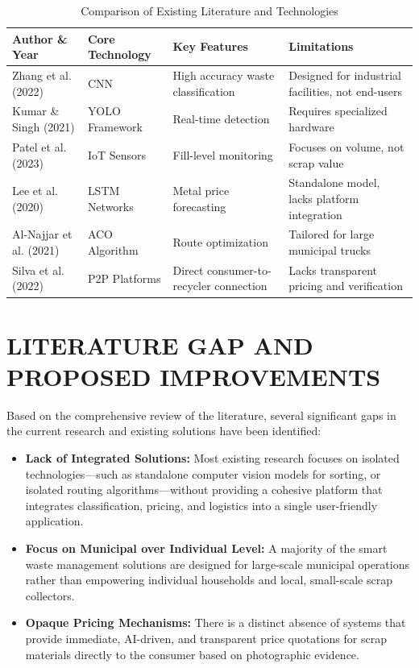 \begin{table}[H]
\centering
\caption{Comparison of Existing Literature and Technologies}
\renewcommand{\arraystretch}{1.5}
\begin{tabular}{|p{3cm}|p{3cm}|p{4cm}|p{4cm}|}
\hline
\textbf{Author \& Year} & \textbf{Core Technology} & \textbf{Key Features} & \textbf{Limitations} \\
\hline
Zhang et al. (2022) & CNN & High accuracy waste classification & Designed for industrial facilities, not end-users \\
\hline
Kumar \& Singh (2021) & YOLO Framework & Real-time detection & Requires specialized hardware \\
\hline
Patel et al. (2023) & IoT Sensors & Fill-level monitoring & Focuses on volume, not scrap value \\
\hline
Lee et al. (2020) & LSTM Networks & Metal price forecasting & Standalone model, lacks platform integration \\
\hline
Al-Najjar et al. (2021) & ACO Algorithm & Route optimization & Tailored for large municipal trucks \\
\hline
Silva et al. (2022) & P2P Platforms & Direct consumer-to-recycler connection & Lacks transparent pricing and verification \\
\hline
\end{tabular}
\end{table}

\section{LITERATURE GAP AND PROPOSED IMPROVEMENTS}
Based on the comprehensive review of the literature, several significant gaps in the current research and existing solutions have been identified:
\begin{itemize}
    \item \textbf{Lack of Integrated Solutions:} Most existing research focuses on isolated technologies—such as standalone computer vision models for sorting, or isolated routing algorithms—without providing a cohesive platform that integrates classification, pricing, and logistics into a single user-friendly application.
    \item \textbf{Focus on Municipal over Individual Level:} A majority of the smart waste management solutions are designed for large-scale municipal operations rather than empowering individual households and local, small-scale scrap collectors.
    \item \textbf{Opaque Pricing Mechanisms:} There is a distinct absence of systems that provide immediate, AI-driven, and transparent price quotations for scrap materials directly to the consumer based on photographic evidence.
\end{itemize}

